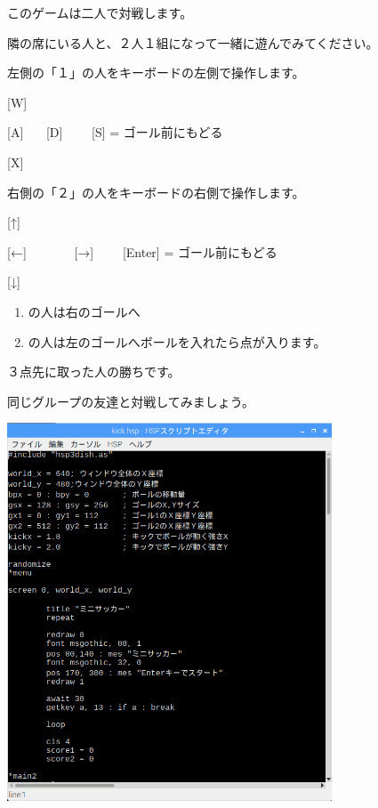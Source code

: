 \documentclass[a4paper,dvipdfmx]{jarticle}
\newcommand\textstyleqwerty[1]{#1}
\begin{document}
\bigskip


\bigskip

このゲームは二人で対戦します。

隣の席にいる人と、２人１組になって一緒に遊んでみてください。

左側の「１」の人をキーボードの左側で操作します。


\bigskip

[W]

[A] \ \ \ [D] \ \ \ \ [S] = ゴール前にもどる

[X]


\bigskip


\bigskip


\bigskip

右側の「２」の人をキーボードの右側で操作します。


\bigskip

[↑]

[←] \ \ \ \ \ \ \ [→] \ \ \ \ [Enter] = ゴール前にもどる

[↓]


\bigskip

\begin{enumerate}
\item の人は右のゴールへ
\item
の人は左のゴールへボールを入れたら点が入ります。
\end{enumerate}

\bigskip

\textstyleqwerty{３点先に取った人の勝ちです。}

\textstyleqwerty{同じグループの友達と対戦してみましょう。}


\bigskip



\begin{center}
\includegraphics[width=9.657cm,height=11.229cm]{text04-img/text04-img006.png}

\end{center}
\end{document}
